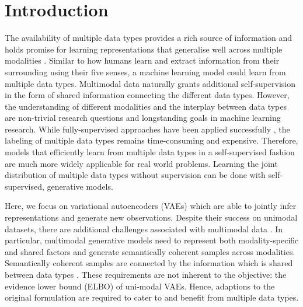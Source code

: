 \section{Introduction}
The availability of multiple data types provides a rich source of information and holds promise for learning representations that generalise well across multiple modalities \parencite{baltrusaitis_multimodal_2019}.
Similar to how humans learn and extract information from their surrounding using their five senses, a machine learning model could learn from multiple data types.
Multimodal data naturally grants additional self-supervision in the form of shared information connecting the different data types.
However, the understanding of different modalities and the interplay between data types are non-trivial research questions and longstanding goals in machine learning research.
While fully-supervised approaches have been applied successfully \parencite{karpathy_deep_2015,tsai_learning_2018}, the labeling of multiple data types remains time-consuming and expensive.
Therefore, models that efficiently learn from multiple data types in a self-supervised fashion are much more widely applicable for real world problems.
Learning the joint distribution of multiple data types without supervision can be done with self-supervised, generative models.

Here, we focus on variational autoencoders (VAEs) \parencite{kingma_auto-encoding_2014,rezende_stochastic_2014} which are able to jointly infer representations and generate new observations.
Despite their success on unimodal datasets, there are additional challenges associated with multimodal data \parencite{suzuki_joint_2016, vedantam_generative_2018}.
In particular, multimodal generative models need to represent both modality-specific and shared factors and generate semantically coherent samples across modalities.
Semantically coherent samples are connected by the information which is shared between data types \parencite{shi_variational_2019}.
These requirements are not inherent to the objective: the evidence lower bound (ELBO) of uni-modal VAEs.
Hence, adaptions to the original formulation are required to cater to and benefit from multiple data types.



